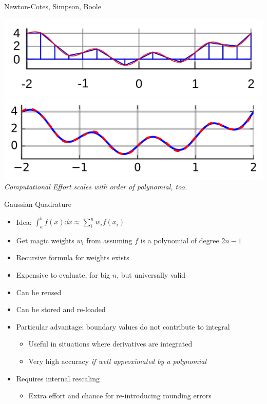 \begin{frame}{Newton-Cotes, Simpson, Boole}
\begin{minipage}{.39\linewidth}
\includegraphics[width=\linewidth]{./gfx/06-rule02-trapezoid}
\includegraphics[width=\linewidth]{./gfx/06-rule03-simpson}
%
\emph{Computational Effort scales with order of polynomial, too.}
\end{minipage}
%
\end{frame}


\begin{frame}{Gaussian Quadrature}
%
\begin{itemize}
\item Idea: $\displaystyle \int_a^b f(x) \dd{x} \approx \sum_i^n w_i f(x_i)$
\item Get magic weights $w_i$ from assuming $f$ is a polynomial of degree $2n - 1$
\item Recursive formula for weights exists
\item Expensive to evaluate, for big $n$, but universally valid
\item[\Thus] Can be reused
\item[\Thus] Can be stored and re-loaded
\item Particular advantage: boundary values do not contribute to integral
	\begin{itemize}
	\item Useful in situations where derivatives are integrated
	\item Very high accuracy \emph{if well approximated by a polynomial}
	\end{itemize}
\item Requires internal rescaling
	\begin{itemize}
	\item Extra effort and chance for re-introducing rounding errors
	\end{itemize}
\end{itemize}
%
\end{frame}

